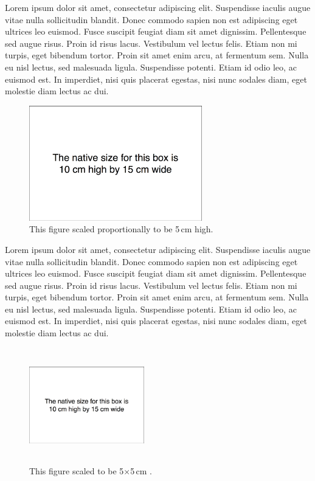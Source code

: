 \documentclass{article}
\begin{document}
\noindent
Lorem ipsum dolor sit amet, consectetur adipiscing elit. Suspendisse
iaculis augue vitae nulla sollicitudin blandit. Donec commodo sapien non
est adipiscing eget ultrices leo euismod. Fusce suscipit feugiat diam
sit amet dignissim. Pellentesque sed augue risus. Proin id risus lacus.
Vestibulum vel lectus felis. Etiam non mi turpis, eget bibendum tortor.
Proin sit amet enim arcu, at fermentum sem. Nulla eu nisl lectus, sed
malesuada ligula. Suspendisse potenti. Etiam id odio leo, ac euismod
est. In imperdiet, nisi quis placerat egestas, nisi nunc sodales diam,
eget molestie diam lectus ac dui.

\begin{figure}
\includegraphics[height=5cm]{fig_10x15.png}
\caption{This figure scaled proportionally to be 5\,cm high.} 
\label{figure3}
\end{figure}

\noindent
Lorem ipsum dolor sit amet, consectetur adipiscing elit. Suspendisse
iaculis augue vitae nulla sollicitudin blandit. Donec commodo sapien non
est adipiscing eget ultrices leo euismod. Fusce suscipit feugiat diam
sit amet dignissim. Pellentesque sed augue risus. Proin id risus lacus.
Vestibulum vel lectus felis. Etiam non mi turpis, eget bibendum tortor.
Proin sit amet enim arcu, at fermentum sem. Nulla eu nisl lectus, sed
malesuada ligula. Suspendisse potenti. Etiam id odio leo, ac euismod
est. In imperdiet, nisi quis placerat egestas, nisi nunc sodales diam,
eget molestie diam lectus ac dui.

\begin{figure}
\includegraphics[height=5cm, width=5cm]{fig_10x15.png}
\caption{This figure scaled to be 5$\times$5\,cm .} 
\label{figure4}
\end{figure}
\end{document}
